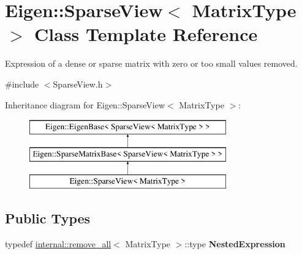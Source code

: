 \hypertarget{class_eigen_1_1_sparse_view}{}\section{Eigen\+::Sparse\+View$<$ Matrix\+Type $>$ Class Template Reference}
\label{class_eigen_1_1_sparse_view}


Expression of a dense or sparse matrix with zero or too small values removed.  




{\ttfamily \#include $<$Sparse\+View.\+h$>$}

Inheritance diagram for Eigen\+::Sparse\+View$<$ Matrix\+Type $>$\+:\begin{figure}[H]
\begin{center}
\leavevmode
\includegraphics[height=3.000000cm]{class_eigen_1_1_sparse_view}
\end{center}
\end{figure}
\subsection*{Public Types}
\begin{DoxyCompactItemize}
\item 
\mbox{\label{class_eigen_1_1_sparse_view_a5ea0cd9b743ad42a749ca83409ca0f97}} 
typedef \mbox{\hyperlink{struct_eigen_1_1internal_1_1remove__all}{internal\+::remove\+\_\+all}}$<$ Matrix\+Type $>$\+::type {\bfseries Nested\+Expression}
\end{DoxyCompactItemize}
